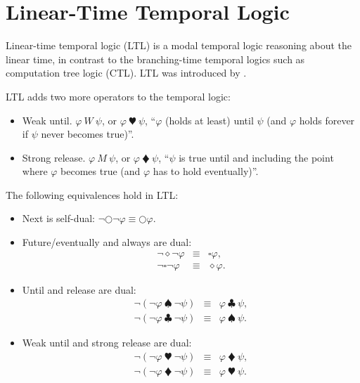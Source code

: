 \section{Linear-Time Temporal Logic}

Linear-time temporal logic (LTL) is a modal temporal logic reasoning about the linear time, in contrast to the branching-time temporal logics such as computation tree logic (CTL). LTL was introduced by \cite{DBLP:conf/focs/Pnueli77}.

LTL adds two more operators to the temporal logic:
\begin{itemize}
    \item Weak until. $\varphi~W~\psi$, or $\varphi~\varheartsuit~\psi$, ``$\varphi$ (holds at least) until $\psi$ (and $\varphi$ holds forever if $\psi$ never becomes true)''.
    \item Strong release. $\varphi~M~\psi$, or $\varphi~\vardiamondsuit~\psi$, ``$\psi$ is true until and including the point where $\varphi$ becomes true (and $\varphi$ has to hold eventually)''.
\end{itemize}

The following equivalences hold in LTL:
\begin{itemize}
    \item Next is self-dual: $\neg\bigcirc\neg\varphi \equiv \bigcirc\varphi$.
    \item Future/eventually and always are dual:
    \begin{eqnarray*}
    \neg\diamond\neg\varphi &\equiv& \square\varphi, \\
    \neg\square\neg\varphi &\equiv& \diamond\varphi.
    \end{eqnarray*}
    \item Until and release are dual: 
    \begin{eqnarray*}
    \neg(\neg\varphi~\spadesuit~\neg\psi) &\equiv& \varphi~\clubsuit~\psi, \\
    \neg(\neg\varphi~\clubsuit~\neg\psi) &\equiv& \varphi~\spadesuit~\psi.
    \end{eqnarray*}
    \item Weak until and strong release are dual: 
    \begin{eqnarray*}
    \neg(\neg\varphi~\varheartsuit~\neg\psi) &\equiv& \varphi~\vardiamondsuit~\psi, \\
    \neg(\neg\varphi~\vardiamondsuit~\neg\psi) &\equiv& \varphi~\varheartsuit~\psi.
    \end{eqnarray*}
\end{itemize}

